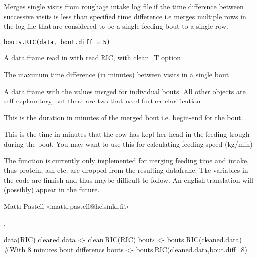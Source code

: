 \begin{Description}\relax
Merges single visits from roughage intake log file if the time
difference between successive visits is less than specified time
difference i.e merges multiple rows in the log file that are considered
to be a single feeding bout to a single row.
\end{Description}
\begin{Usage}
\begin{verbatim}
bouts.RIC(data, bout.diff = 5)
\end{verbatim}
\end{Usage}
\begin{Arguments}
\begin{ldescription}
\item[\code{data}] A data.frame read in with read.RIC, with clean=T option
\item[\code{bout.diff}] The maximum time difference (in minutes) between visits in a
single bout
\end{ldescription}
\end{Arguments}
\begin{Value}
A data.frame with the values merged for individual bouts. All other
objects are self.explanatory, but there are two that need further
clarification  
\begin{ldescription}
\item[\code{bout.duration}] This is the duration in minutes of the merged bout
i.e. begin-end for the bout.
\item[\code{intake.duration}] This is the time in minutes that the cow has kept her head
in the feeding trough during the bout. You may want to use this for
calculating feeding speed (kg/min)
\end{ldescription}
\end{Value}
\begin{Note}\relax
The function is currently only implemented for merging feeding
time and intake, thus protein, ash etc. are dropped from the resulting
datafrane. The variables in the code are finnish and thus maybe difficult to
follow. An english translation will (possibly) appear in the future.
\end{Note}
\begin{Author}\relax
Matti Pastell <matti.pastell@helsinki.fi>
\end{Author}
\begin{SeeAlso}\relax
{}, 
\end{SeeAlso}
\begin{Examples}
\begin{ExampleCode}
data(RIC)
cleaned.data <- clean.RIC(RIC)
bouts <- bouts.RIC(cleaned.data)
#With 8 minutes bout difference
bouts <- bouts.RIC(cleaned.data,bout.diff=8)
\end{ExampleCode}
\end{Examples}

